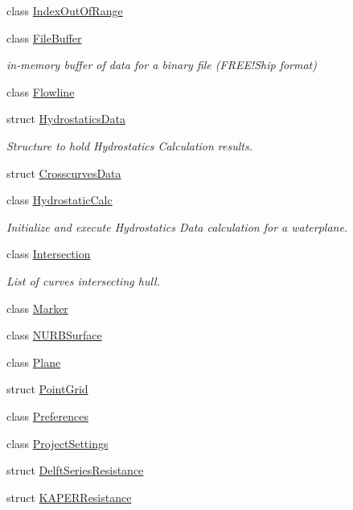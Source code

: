 \begin{DoxyCompactItemize}
\item 
class \hyperlink{classShipCAD_1_1IndexOutOfRange}{Index\-Out\-Of\-Range}
\item 
class \hyperlink{classShipCAD_1_1FileBuffer}{File\-Buffer}
\begin{DoxyCompactList}\small\item\em in-\/memory buffer of data for a binary file (F\-R\-E\-E!\-Ship format) \end{DoxyCompactList}\item 
class \hyperlink{classShipCAD_1_1Flowline}{Flowline}
\item 
struct \hyperlink{structShipCAD_1_1HydrostaticsData}{Hydrostatics\-Data}
\begin{DoxyCompactList}\small\item\em Structure to hold Hydrostatics Calculation results. \end{DoxyCompactList}\item 
struct \hyperlink{structShipCAD_1_1CrosscurvesData}{Crosscurves\-Data}
\item 
class \hyperlink{classShipCAD_1_1HydrostaticCalc}{Hydrostatic\-Calc}
\begin{DoxyCompactList}\small\item\em Initialize and execute Hydrostatics Data calculation for a waterplane. \end{DoxyCompactList}\item 
class \hyperlink{classShipCAD_1_1Intersection}{Intersection}
\begin{DoxyCompactList}\small\item\em List of curves intersecting hull. \end{DoxyCompactList}\item 
class \hyperlink{classShipCAD_1_1Marker}{Marker}
\item 
class \hyperlink{classShipCAD_1_1NURBSurface}{N\-U\-R\-B\-Surface}
\item 
class \hyperlink{classShipCAD_1_1Plane}{Plane}
\item 
struct \hyperlink{structShipCAD_1_1PointGrid}{Point\-Grid}
\item 
class \hyperlink{classShipCAD_1_1Preferences}{Preferences}
\item 
class \hyperlink{classShipCAD_1_1ProjectSettings}{Project\-Settings}
\item 
struct \hyperlink{structShipCAD_1_1DelftSeriesResistance}{Delft\-Series\-Resistance}
\item 
struct \hyperlink{structShipCAD_1_1KAPERResistance}{K\-A\-P\-E\-R\-Resistance}

\end{DoxyCompactItemize}
